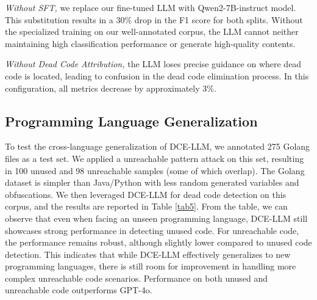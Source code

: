 \documentclass[11pt]{article}
\begin{document}
\textit{Without SFT, }we replace our fine-tuned LLM with Qwen2-7B-instruct model. This substitution results in a 30\% drop in the F1 score for both splits. Without the specialized training on our well-annotated corpus, the LLM cannot neither maintaining high classification performance or generate high-quality contents.

\textit{Without Dead Code Attribution, }the LLM loses precise guidance on where dead code is located, leading to confusion in the dead code elimination process. In this configuration, all metrics decrease by approximately 3\%.





\subsection{Programming Language Generalization}
To test the cross-language generalization of DCE-LLM, we annotated 275 Golang files as a test set. We applied a unreachable pattern attack on this set, resulting in 100 unused and 98 unreachable samples (some of which overlap).
The Golang dataset is simpler than Java/Python with less random generated variables and obfuscations.
We then leveraged DCE-LLM for dead code detection on this corpus, and the results are reported in Table \ref{tab5}. From the table, we can observe that even when facing an unseen programming language, DCE-LLM still showcases strong performance in detecting unused code.
For unreachable code, the performance remains robust, although slightly lower compared to unused code detection. This indicates that while DCE-LLM effectively generalizes to new programming languages, there is still room for improvement in handling more complex unreachable code scenarios. Performance on both unused and unreachable code outperforms GPT-4o.
\end{document}
